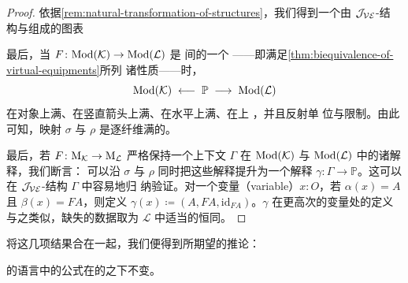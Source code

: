 \begin{proof}
依据\cref{rem:natural-transformation-of-structures}，我们得到一个由 $\mathcal{J}_{\mathcal{VE}}$-结
构与\trNaturalTransformation{}组成的图表
\begin{center}
\end{center}
最后，当 $F\colon\mathrm{Mod}(\mathcal{K})\to\mathrm{Mod}(\mathcal{L})$ 是\trVirtualEquipment{}%
间的一个%
\trBiequivalence——即满足\cref{thm:biequivalence-of-virtual-equipments}所列
诸性质——时，\trForgetfulFunctor
\begin{equation*}
\mathrm{Mod}(\mathcal{K}) \;\longleftarrow\; \mathbb{P} \;\longrightarrow\; \mathrm{Mod}(\mathcal{L})
\end{equation*}
在对象上满、在竖直箭头上满、在水平\trModule{}上满、在\trCell{}上%
\trFullyFaithful，并且反射单
位\trCell{}与限制\trCell。由此可知，映射 $\sigma$ 与 $\rho$ 是逐纤维满的。

最后，若 $F\colon\mathrm{M}_{\mathcal{K}}\to\mathrm{M}_{\mathcal{L}}$ 严格保持一个上下文
$\Gamma$ 在 $\mathrm{Mod}(\mathcal{K})$ 与 $\mathrm{Mod}(\mathcal{L})$ 中的诸解释，我们断言：
可以沿 $\sigma$ 与 $\rho$ 同时把这些解释提升为一个解释
$\gamma\colon\Gamma\to\mathbb{P}$。这可以在 $\mathcal{J}_{\mathcal{VE}}$-结构 $\Gamma$ 中容易地归
纳验证。对一个变量（variable）$x\colon O$，若 $\alpha(x)=A$ 且
$\beta(x)=FA$，则定义 $\gamma(x)\coloneqq(A,FA,\mathrm{id}_{FA})$。$\gamma$
在更高次的变量处的定义与之类似，缺失的数据取为 $\mathcal{L}$ 中适当的恒同。
\end{proof}

将这几项结果合在一起，我们便得到所期望的推论：

\begin{corollary}\label{cor:language-for-model-independence}
\trVirtualEquipment{}的语言中的公式在\trInfinityCosmos{}的\trBiequivalence{}之下不变。
\end{corollary}


